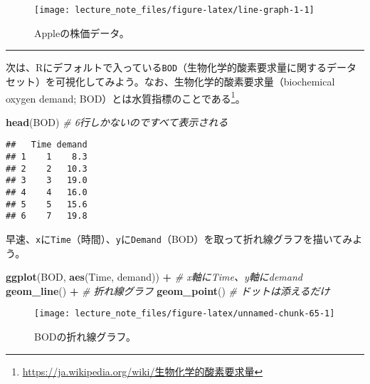 \documentclass[]{book}
\newenvironment{Shaded}{\begin{snugshade}}{\end{snugshade}}
\newcommand{\KeywordTok}[1]{\textcolor[rgb]{0.13,0.29,0.53}{\textbf{#1}}}
\newcommand{\StringTok}[1]{\textcolor[rgb]{0.31,0.60,0.02}{#1}}
\newcommand{\CommentTok}[1]{\textcolor[rgb]{0.56,0.35,0.01}{\textit{#1}}}
\newcommand{\OperatorTok}[1]{\textcolor[rgb]{0.81,0.36,0.00}{\textbf{#1}}}
\newcommand{\NormalTok}[1]{#1}
\let\rmarkdownfootnote\footnote%
\def\footnote{\protect\rmarkdownfootnote}
\begin{document}
\begin{figure}

{\centering \texttt{[image: lecture\_note\_files/figure-latex/line-graph-1-1]} 

}

\caption{Appleの株価データ。}\label{fig:line-graph-1}
\end{figure}

\begin{center}\rule{0.5\linewidth}{\linethickness}\end{center}

次は、Rにデフォルトで入っている\texttt{BOD}（生物化学的酸素要求量に関するデータセット）を可視化してみよう。なお、生物化学的酸素要求量（biochemical
oxygen demand; BOD）とは水質指標のことである\footnote{\url{https://ja.wikipedia.org/wiki/生物化学的酸素要求量}}。

\begin{Shaded}
\begin{Highlighting}[]
\KeywordTok{head}\NormalTok{(BOD) }\CommentTok{# 6行しかないのですべて表示される}
\end{Highlighting}
\end{Shaded}

\begin{verbatim}
##   Time demand
## 1    1    8.3
## 2    2   10.3
## 3    3   19.0
## 4    4   16.0
## 5    5   15.6
## 6    7   19.8
\end{verbatim}

早速、\texttt{x}に\texttt{Time}（時間）、\texttt{y}に\texttt{Demand}（BOD）を取って折れ線グラフを描いてみよう。



\begin{Shaded}
\begin{Highlighting}[]
\KeywordTok{ggplot}\NormalTok{(BOD, }\KeywordTok{aes}\NormalTok{(Time, demand)) }\OperatorTok{+}\StringTok{ }\CommentTok{# x軸にTime、y軸にdemand}
\StringTok{  }\KeywordTok{geom_line}\NormalTok{() }\OperatorTok{+}\StringTok{ }\CommentTok{# 折れ線グラフ}
\StringTok{  }\KeywordTok{geom_point}\NormalTok{() }\CommentTok{# ドットは添えるだけ}
\end{Highlighting}
\end{Shaded}

\begin{figure}

{\centering \texttt{[image: lecture\_note\_files/figure-latex/unnamed-chunk-65-1]} 

}

\caption{BODの折れ線グラフ。}\label{fig:unnamed-chunk-65}
\end{figure}
\end{document}
